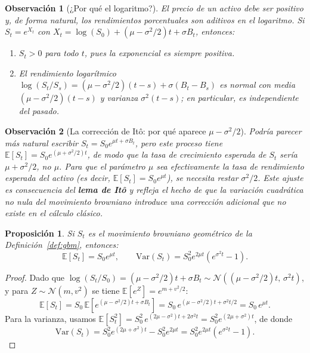 \documentclass[12pt]{book}
\newtheorem{proposition}{Proposición}[chapter]
\newtheorem{remark}{Observación}[chapter]
\begin{document}
\begin{remark}[¿Por qué el logaritmo?]
El precio de un activo debe ser positivo y, de forma natural, los rendimientos porcentuales son aditivos en el logaritmo. Si $S_t = e^{X_t}$ con $X_t = \log(S_0) + (\mu - \sigma^2/2)t + \sigma B_t$, entonces:
\begin{enumerate}
    \item[\normalfont(a)] $S_t > 0$ para todo $t$, pues la exponencial es siempre positiva.
    \item[\normalfont(b)] El rendimiento logarítmico $\log(S_t/S_s) = (\mu - \sigma^2/2)(t-s) + \sigma(B_t - B_s)$ es normal con media $(\mu - \sigma^2/2)(t-s)$ y varianza $\sigma^2(t-s)$; en particular, es independiente del pasado.
\end{enumerate}
\end{remark}

\begin{remark}[La corrección de Itô: por qué aparece $\mu - \sigma^2/2$]
Podría parecer más natural escribir $S_t = S_0 e^{\mu t + \sigma B_t}$, pero este proceso tiene $\mathbb{E}[S_t] = S_0 e^{(\mu + \sigma^2/2)t}$, de modo que la tasa de crecimiento esperada de $S_t$ sería $\mu + \sigma^2/2$, no $\mu$. Para que el parámetro $\mu$ sea efectivamente la tasa de rendimiento esperada del activo (es decir, $\mathbb{E}[S_t] = S_0 e^{\mu t}$), se necesita restar $\sigma^2/2$. Este ajuste es consecuencia del \textbf{lema de Itô} y refleja el hecho de que la variación cuadrática no nula del movimiento browniano introduce una corrección adicional que no existe en el cálculo clásico.
\end{remark}

\begin{proposition}
Si $S_t$ es el movimiento browniano geométrico de la Definición~\ref{def:gbm}, entonces:
\[
    \mathbb{E}[S_t] = S_0 e^{\mu t}, \qquad \mathrm{Var}(S_t) = S_0^2 e^{2\mu t}\left(e^{\sigma^2 t} - 1\right).
\]
\end{proposition}

\begin{proof}
Dado que $\log(S_t/S_0) = (\mu - \sigma^2/2)t + \sigma B_t \sim \mathcal{N}((\mu-\sigma^2/2)t,\, \sigma^2 t)$, y para $Z \sim \mathcal{N}(m, v^2)$ se tiene $\mathbb{E}[e^Z] = e^{m + v^2/2}$:
\[
    \mathbb{E}[S_t] = S_0\,\mathbb{E}\!\left[e^{(\mu-\sigma^2/2)t + \sigma B_t}\right] = S_0\,e^{(\mu - \sigma^2/2)t + \sigma^2 t/2} = S_0\,e^{\mu t}.
\]
Para la varianza, usamos $\mathbb{E}[S_t^2] = S_0^2\,e^{(2\mu - \sigma^2)t + 2\sigma^2 t} = S_0^2 e^{(2\mu + \sigma^2)t}$, de donde
\[
    \mathrm{Var}(S_t) = S_0^2 e^{(2\mu+\sigma^2)t} - S_0^2 e^{2\mu t} = S_0^2 e^{2\mu t}(e^{\sigma^2 t} - 1).
\]
\end{proof}
\end{document}
